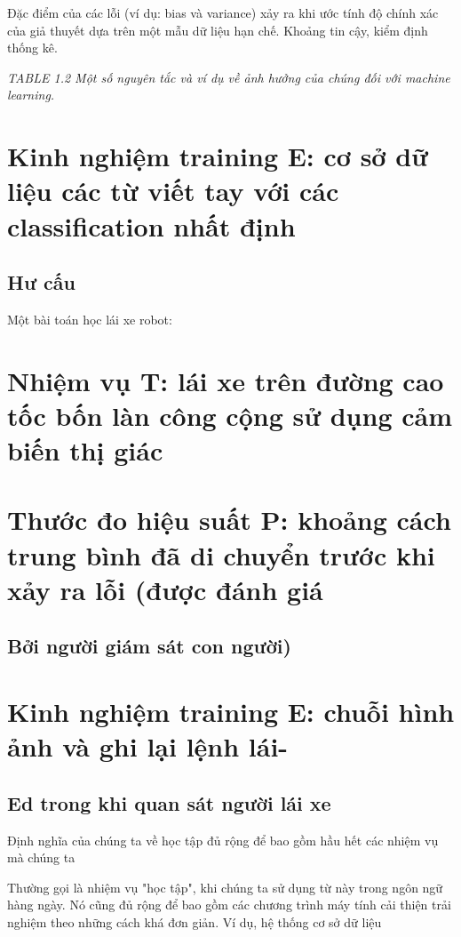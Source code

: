 Đặc điểm của các lỗi (ví dụ: bias và variance) xảy ra khi ước tính độ chính xác của giả thuyết dựa trên một mẫu dữ liệu hạn chế. Khoảng tin cậy, kiểm định thống kê.

\noindent\textit{TABLE 1.2 Một số nguyên tắc và ví dụ về ảnh hưởng của chúng đối với machine learning.}

\section{Kinh nghiệm training E: cơ sở dữ liệu các từ viết tay với các classification nhất định}

\subsection{Hư cấu}

Một bài toán học lái xe robot:

\section{Nhiệm vụ T: lái xe trên đường cao tốc bốn làn công cộng sử dụng cảm biến thị giác}

\section{Thước đo hiệu suất P: khoảng cách trung bình đã di chuyển trước khi xảy ra lỗi (được đánh giá}

\subsection{Bởi người giám sát con người)}

\section{Kinh nghiệm training E: chuỗi hình ảnh và ghi lại lệnh lái-}

\subsection{Ed trong khi quan sát người lái xe}

Định nghĩa của chúng ta về học tập đủ rộng để bao gồm hầu hết các nhiệm vụ mà chúng ta

Thường gọi là nhiệm vụ "học tập", khi chúng ta sử dụng từ này trong ngôn ngữ hàng ngày. Nó cũng đủ rộng để bao gồm các chương trình máy tính cải thiện trải nghiệm theo những cách khá đơn giản. Ví dụ, hệ thống cơ sở dữ liệu

